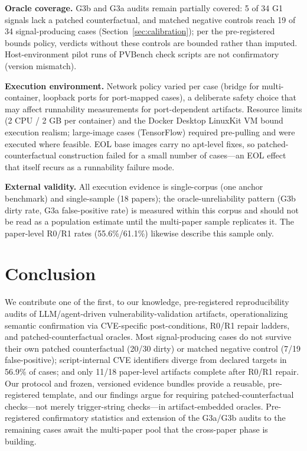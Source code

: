 \documentclass[11pt]{article}
\begin{document}
\textbf{Oracle coverage.} G3b and G3a audits remain partially covered: 5 of 34 G1 signals lack a patched counterfactual, and matched negative controls reach 19 of 34 signal-producing cases (Section~\ref{sec:calibration}); per the pre-registered bounds policy, verdicts without these controls are bounded rather than imputed. Host-environment pilot runs of PVBench check scripts are not confirmatory (version mismatch).

\textbf{Execution environment.} Network policy varied per case (bridge for multi-container, loopback ports for port-mapped cases), a deliberate safety choice that may affect runnability measurements for port-dependent artifacts. Resource limits (2 CPU / 2 GB per container) and the Docker Desktop LinuxKit VM bound execution realism; large-image cases (TensorFlow) required pre-pulling and were executed where feasible. EOL base images carry no apt-level fixes, so patched-counterfactual construction failed for a small number of cases---an EOL effect that itself recurs as a runnability failure mode.

\textbf{External validity.} All execution evidence is single-corpus (one anchor benchmark) and single-sample (18 papers); the oracle-unreliability pattern (G3b dirty rate, G3a false-positive rate) is measured within this corpus and should not be read as a population estimate until the multi-paper sample replicates it. The paper-level R0/R1 rates (55.6\%/61.1\%) likewise describe this sample only.

\section{Conclusion}
\label{sec:conclusion}
We contribute one of the first, to our knowledge, pre-registered reproducibility audits of LLM/agent-driven vulnerability-validation artifacts, operationalizing semantic confirmation via CVE-specific post-conditions, R0/R1 repair ladders, and patched-counterfactual oracles. Most signal-producing cases do not survive their own patched counterfactual (20/30 dirty) or matched negative control (7/19 false-positive); script-internal CVE identifiers diverge from declared targets in 56.9\% of cases; and only 11/18 paper-level artifacts complete after R0/R1 repair. Our protocol and frozen, versioned evidence bundles provide a reusable, pre-registered template, and our findings argue for requiring patched-counterfactual checks---not merely trigger-string checks---in artifact-embedded oracles. Pre-registered confirmatory statistics and extension of the G3a/G3b audits to the remaining cases await the multi-paper pool that the cross-paper phase is building.
\end{document}
